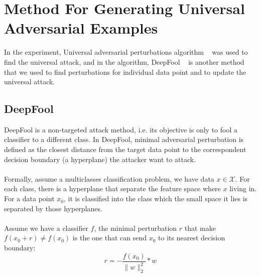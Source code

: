 \documentclass{article}
\begin{document}




\section{Method For Generating Universal Adversarial Examples }
\noindent In the experiment, Universal adversarial perturbations algorithm ~\cite{Moosavi-Dezfooli_2017_CVPR} was used to find the universal attack, and in the algorithm, DeepFool ~\cite{Moosavi-Dezfooli_2016_CVPR} is another method that we used to find perturbations for individual data point and to update the universal attack.

\subsection{DeepFool}
DeepFool is a non-targeted attack method, i.e. its objective is only to fool a classifier to a different class. In DeepFool, minimal adversarial perturbation is defined as the closest distance from the target data point to the correspondent decision boundary (a hyperplane) the attacker want to attack. 
\\ \hspace*{\fill} \\Formally, assume a multiclasses classification problem, we have data $x  \in \mathcal{X}$. For each class, there is a hyperplane that separate the feature space where $x$ living in. For a data point $x_0$, it is classified into the class which the small space it lies is separated by those hyperplanes. 
\\ \hspace*{\fill} \\Assume we have a classifier $f$, the minimal perturbation $r$ that make $f(x_0 + r) \neq f(x_0) $ is the one that can send $x_0$ to its nearest decision boundary:
\begin{equation*}
 r = -\frac{f\left(x_{0}\right)}{\|w\|_{2}^{2}} * w \end{equation*}
\end{document}
